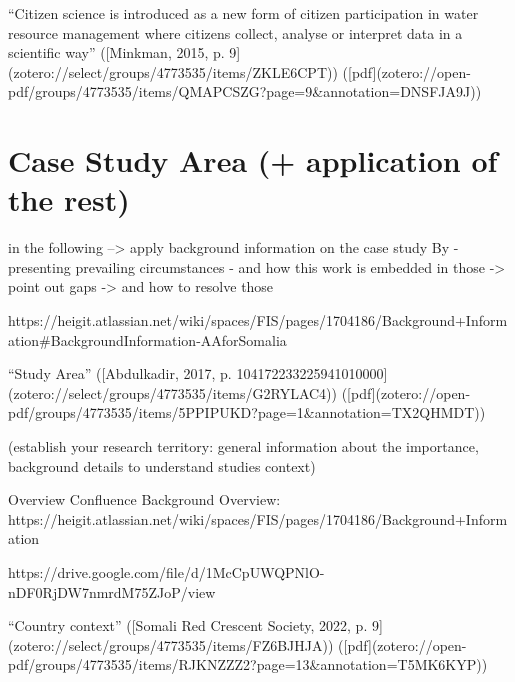 {“Citizen science is introduced as a new form of citizen participation in water resource management where citizens collect, analyse or interpret data in a scientific way” ([Minkman, 2015, p. 9](zotero://select/groups/4773535/items/ZKLE6CPT)) ([pdf](zotero://open-pdf/groups/4773535/items/QMAPCSZG?page=9&annotation=DNSFJA9J))




\section{Case Study Area (+ application of the rest)} %


in the following
--> apply background information on the case study By
    - presenting prevailing circumstances
    - and how this work is embedded in those
    -> point out gaps
    -> and how to resolve those





https://heigit.atlassian.net/wiki/spaces/FIS/pages/1704186/Background+Information#BackgroundInformation-AAforSomalia

“Study Area” ([Abdulkadir, 2017, p. 104172233225941010000](zotero://select/groups/4773535/items/G2RYLAC4)) ([pdf](zotero://open-pdf/groups/4773535/items/5PPIPUKD?page=1&annotation=TX2QHMDT))


(establish your research territory: general information about the importance, background details to understand studies context)

Overview Confluence Background Overview:
https://heigit.atlassian.net/wiki/spaces/FIS/pages/1704186/Background+Information

https://drive.google.com/file/d/1McCpUWQPNlO-nDF0RjDW7nmrdM75ZJoP/view

“Country context” ([Somali Red Crescent Society, 2022, p. 9](zotero://select/groups/4773535/items/FZ6BJHJA)) ([pdf](zotero://open-pdf/groups/4773535/items/RJKNZZZ2?page=13&annotation=T5MK6KYP))
}
